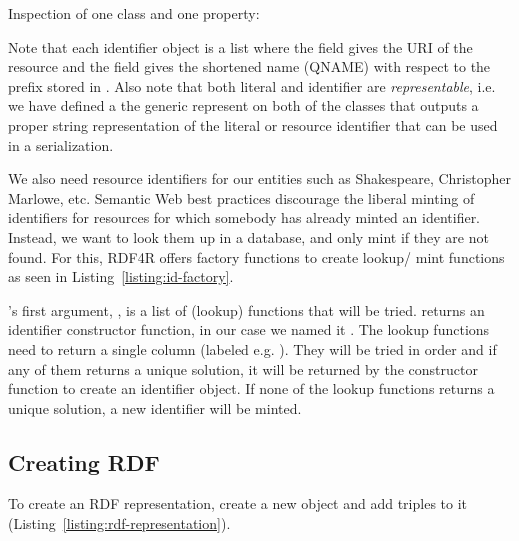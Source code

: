 

Inspection of one class and one property:



Note that each identifier object is a list where the field  gives the URI of the resource and the field  gives the shortened name (QNAME) with respect to the prefix stored in . Also note that both literal and identifier are \emph{representable}, i.e. we have defined a the generic represent on both of the classes that outputs a proper string representation of the literal or resource identifier that can be used in a serialization.

We also need resource identifiers for our entities such as Shakespeare, Christopher Marlowe, etc. Semantic Web best practices discourage the liberal minting of identifiers for resources for which somebody has already minted an identifier. Instead, we want to look them up in a database, and only mint if they are not found. For this, RDF4R offers factory functions to create lookup/ mint functions as seen in Listing~\ref{listing:id-factory}.



's first argument, , is a list of (lookup) functions that will be tried.  returns an identifier constructor function, in our case we named it . The lookup functions need to return a single column (labeled e.g. ). They will be tried in order and if any of them returns a unique solution, it will be returned by the constructor function to create an identifier object. If none of the lookup functions returns a unique solution, a new identifier will be minted. 

\subsection{Creating RDF}

To create an RDF representation, create a new  object and add triples to it (Listing~\ref{listing:rdf-representation}).

